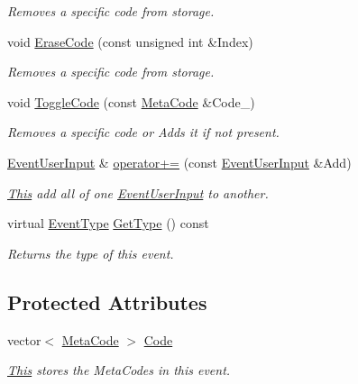 \begin{DoxyCompactItemize}
\begin{DoxyCompactList}\small\item\em Removes a specific code from storage. \item\end{DoxyCompactList}\item 
void \hyperlink{classphys_1_1EventUserInput_a583084578443019d6e286b8f0e02ce58}{EraseCode} (const unsigned int \&Index)
\begin{DoxyCompactList}\small\item\em Removes a specific code from storage. \item\end{DoxyCompactList}\item 
void \hyperlink{classphys_1_1EventUserInput_adf603505c43162cf9331a486d5832f75}{ToggleCode} (const \hyperlink{classphys_1_1MetaCode}{MetaCode} \&Code\_\-)
\begin{DoxyCompactList}\small\item\em Removes a specific code or Adds it if not present. \item\end{DoxyCompactList}\item 
\hyperlink{classphys_1_1EventUserInput}{EventUserInput} \& \hyperlink{classphys_1_1EventUserInput_a1d6895e1b3814c1a63f5605b88ba85e5}{operator+=} (const \hyperlink{classphys_1_1EventUserInput}{EventUserInput} \&Add)
\begin{DoxyCompactList}\small\item\em \hyperlink{structThis}{This} add all of one \hyperlink{classphys_1_1EventUserInput}{EventUserInput} to another. \item\end{DoxyCompactList}\item 
virtual \hyperlink{classphys_1_1EventBase_a5e6a8564e127f654123f0bf6a2751923}{EventType} \hyperlink{classphys_1_1EventUserInput_a3e803a8d9bcc1576fe04d2245a86ec80}{GetType} () const 
\begin{DoxyCompactList}\small\item\em Returns the type of this event. \item\end{DoxyCompactList}\end{DoxyCompactItemize}
\subsection*{Protected Attributes}
\begin{DoxyCompactItemize}
\item 
vector$<$ \hyperlink{classphys_1_1MetaCode}{MetaCode} $>$ \hyperlink{classphys_1_1EventUserInput_aee3dc1d8cac82482651487c48c6c60c9}{Code}
\begin{DoxyCompactList}\small\item\em \hyperlink{structThis}{This} stores the MetaCodes in this event. \item\end{DoxyCompactList}\end{DoxyCompactItemize}


